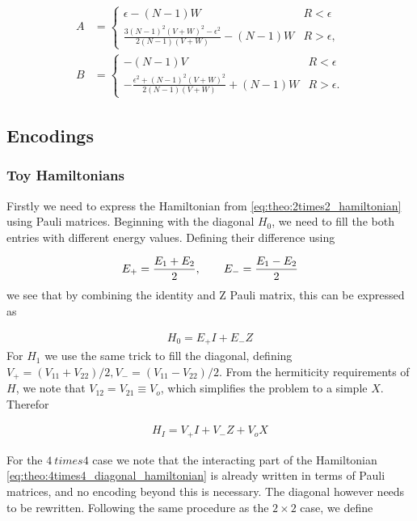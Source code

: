 \begin{align*}
    A &= \begin{cases}
        \epsilon - (N-1)W & R < \epsilon \\
        \frac{3(N-1)^2(V+W)^2 - \epsilon^2}{2(N-1)(V+W)} - (N-1)W & R > \epsilon,
    \end{cases} \\
    B &= \begin{cases}
        -(N-1)V & R < \epsilon \\
        -\frac{\epsilon^2 + (N-1)^2 (V+W)^2 }{2(N-1)(V+W)} + (N-1)W & R > \epsilon.
    \end{cases}
\end{align*}

\subsection{Encodings}
\subsubsection{Toy Hamiltonians}
Firstly we need to express the Hamiltonian from \cref{eq:theo:2times2_hamiltonian} using Pauli matrices. Beginning with the diagonal $H_0$, we need to fill the both entries with different energy values. Defining their difference using

\begin{align*}
    E_+ = \frac{E_1 + E_2}{2},\hspace{20px} E_- = \frac{E_1 - E_2}{2}
\end{align*}
we see that by combining the identity and Z Pauli matrix, this can be expressed as

\begin{align*}
    H_0 = E_+ I + E_- Z
\end{align*}
For $H_1$ we use the same trick to fill the diagonal, defining $V_+ = (V_{11} + V_{22})/2, V_- = (V_{11} - V_{22})/2$. From the hermiticity requirements of $H$, we note that $V_{12} = V_{21} \equiv V_o$, which simplifies the problem to a simple $X$. Therefor

\begin{align*}
    H_I = V_+ I + V_- Z + V_o X
\end{align*}

For the $4 \ times 4$ case we note that the interacting part of the Hamiltonian \cref{eq:theo:4times4_diagonal_hamiltonian} is already written in terms of Pauli matrices, and no encoding beyond this is necessary. The diagonal however needs to be rewritten. Following the same procedure as the $2 \times 2$ case, we define

